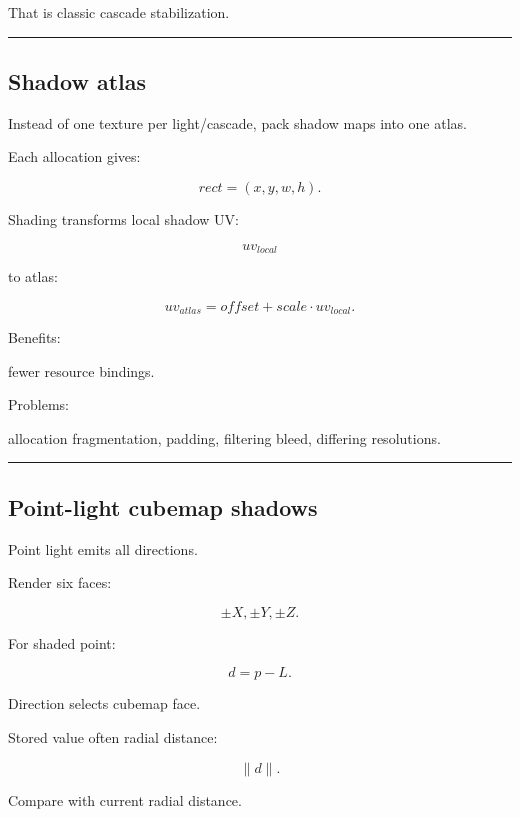 That is classic cascade stabilization.

\begin{center}\rule{0.5\linewidth}{0.5pt}\end{center}

\subsection{Shadow atlas}\label{04-visual-computing-ii-ch040-shadow-atlas}

\hypertarget{04-visual-computing-ii-ch040-shadow-atlas}{}

Instead of one texture per light/cascade, pack shadow maps into one atlas.

Each allocation gives:

\[
rect=
(x,y,w,h).
\]

Shading transforms local shadow UV:

\[
uv_{local}
\]

to atlas:

\[
uv_{atlas}
=
offset+
scale\cdot uv_{local}.
\]

Benefits:

fewer resource bindings.

Problems:

allocation fragmentation, padding, filtering bleed, differing resolutions.

\begin{center}\rule{0.5\linewidth}{0.5pt}\end{center}

\subsection{Point-light cubemap shadows}\label{04-visual-computing-ii-ch040-point-light-cubemap-shadows}

\hypertarget{04-visual-computing-ii-ch040-point-light-cubemap-shadows}{}

Point light emits all directions.

Render six faces:

\[
\pm X,\pm Y,\pm Z.
\]

For shaded point:

\[
d=p-L.
\]

Direction selects cubemap face.

Stored value often radial distance:

\[
\|d\|.
\]

Compare with current radial distance.

